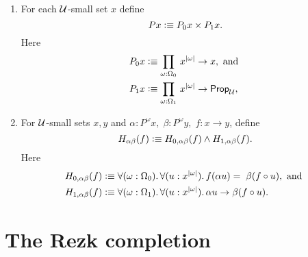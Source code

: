 \documentclass[hott-all.tex]{subfiles}
\begin{document}
\begin{defn}\label{defn:fo-notion-of-structure}
\mbox{}
\begin{enumerate}
\item For each $\mathcal{U}$-small set $x$ define
  \[ Px \vcentcolon\equiv P_0x\times P_1x.\]
  Here
  \begin{align*}
    P_0x &\defeq \prd{\omega:\Omega_0} x^{|\omega|}\to x, \mbox{ and } \\
    P_1x &\defeq \prd{\omega:\Omega_1} x^{|\omega|}\to \propU,
  \end{align*}
\item For $\mathcal{U}$-small sets $x,y$ and
  $\alpha:P^\omega x,\;\beta:P^\omega y,\; f:x\to y$, define
  \[ H_{\alpha\beta}(f) \vcentcolon\equiv H_{0,\alpha\beta}(f)\wedge H_{1,\alpha\beta}(f).\]
  Here
  \begin{align*}
    H_{0,\alpha\beta}(f) &\defeq
    \fall{\omega:\Omega_0}{u:x^{|\omega|}} f(\alpha u)=\;\beta(f\circ u),
    \mbox{ and }\\
    H_{1,\alpha\beta}(f) &\defeq
    \fall{\omega:\Omega_1}{u:x^{|\omega|}} \alpha u\to\beta(f\circ u).
  \end{align*}
\end{enumerate}
\end{defn}



\section{The Rezk completion}
\label{sec:rezk}

%
\end{document}
